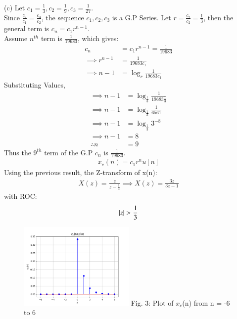 \documentclass[journal,12pt,twocolumn]{IEEEtran}
\theoremstyle{remark}
\begin{document}
(c) Let $c_1 = \frac{1}{3}, c_2 = \frac{1}{9}, c_3 = \frac{1}{27}$.\\
Since $\frac{c_2}{c_1} = \frac{c_3}{c_2}$, the sequence $c_1, c_2, c_3$ is a G.P Series.
Let $r = \frac{c_2}{c_2} = \frac{1}{3}$, then the general term is $c_n = c_1 r^{n-1}$.\\
Assume $n^{th}$ term is $\frac{1}{19683}$, which gives: 
\begin{align}
    c_n &= c_1 r^{n-1} = \frac{1}{19683}\\
    \implies r^{n-1} &= \frac{1}{19683 c_1}\\
    \implies n - 1 &= \log_{r}{\frac{1}{19683 c_1}}
\end{align}
Substituting Values,
\begin{align}
    \implies n - 1 &= \log_{\frac{1}{3}}{\frac{1}{19683 \frac{1}{3}}}\\
    \implies n - 1 &= \log_{\frac{1}{3}}{\frac{1}{6561}}\\
    \implies n - 1 &= \log_{\frac{1}{3}}{3^{-8}}\\
    \implies n - 1 &= 8\\
    \therefore n &= 9
\end{align}
Thus the $9^{th}$ term of the G.P $c_n$ is $\frac{1}{19683}$.
\begin{align}  x_c(n) = c_1r^{n}u[n]  \end{align}
Using the previous result, the Z-transform of x(n):
\begin{align}
    X(z) = \frac{z}{z - \frac{1}{3}}
    \implies X(z) = \frac{3z}{3z - 1}
\end{align} with ROC: \[ \left\vert z\right\vert > \frac{1}{3} \]

\begin{figure}[h!]
    \centering
    \includegraphics[width=0.5\textwidth]{figs/c.png}
    Fig. 3: Plot of $x_c$(n) from n = -6 to 6
    \label{fig:img3}
\end{figure}
\end{document}
